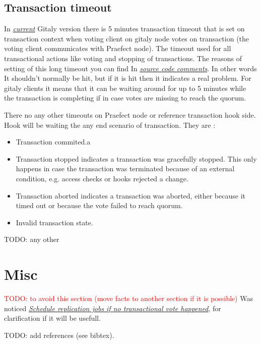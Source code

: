\documentclass[acmlarge, screen, nonacm]{acmart}
\newcommand{\todo}[1]{\textcolor{red}{TODO: #1}}
\begin{document}
\subsection{Transaction timeout}
In \emph{\href{https://gitlab.com/gitlab-org/gitaly/-/tags/v14.0.0-rc1}{ current}} 
Gitaly version there is 5 minutes transaction timeout that is set on transaction 
context when voting client on gitaly node votes on transaction (the voting client 
communicates with Praefect node).
The timeout used for all transactional actions like voting and stopping of transactions.
 The reasons of setting of this long timeout you can find 
In \emph{\href{https://gitlab.com/gitlab-org/gitaly/-/blob/master/internal/gitaly/transaction/manager.go\#L21}{ source code comments}}. 
In other words It shouldn't normally be hit, but if it is hit then it indicates a real problem. 
For gitaly clients it means that it can be waiting around for up to 5 minutes while the transaction 
is completing if in case votes are missing to reach the quorum.

There no any other timeouts on Praefect node or reference transaction hook side. 
Hook will be waiting the any end scenario of transaction. They are :

\begin{itemize}
\item Transaction commited.a
\item Transaction stopped indicates a transaction was gracefully stopped. 
This only happens in case the transaction was terminated because of an external condition, e.g. access checks or hooks rejected a change.
\item Transaction aborted indicates a transaction was aborted, either because it timed out or because the vote failed to reach quorum.
\item Invalid transaction state.
\end{itemize}


TODO: any other 

\section{Misc}
\todo{to avoid this section (move facts to another section if it is possible)}
  Was noticed
  \emph{\href{https://gitlab.com/gitlab-org/gitaly/-/issues/2466}{Schedule replication jobs if no transactional vote happened}},
  for clarification if it will be usefull.

TODO: add references (see bibtex).
\end{document}
